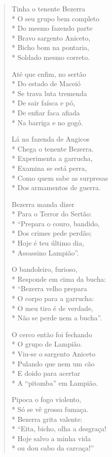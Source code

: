 \begin{verse}
Tinha o tenente Bezerra\\*
O seu grupo bem completo\\*
Do mesmo fazendo parte\\*
Bravo sargento Aniceto,\\*
Bicho bom na pontaria,\\*
Soldado mesmo correto.

Até que enfim, no sertão\\*
Do estado de Maceió\\*
Se trava luta tremenda\\*
De sair faísca e pó,\\*
De enfiar faca afiada\\*
Na barriga e no gogó.

Lá na fazenda de Angicos\\*
Chega o tenente Bezerra.\\*
Experimenta a garrucha,\\*
Examina se está perra,\\*
Como quem sabe as surpresas\\*
Dos armamentos de guerra.

Bezerra manda dizer\\*
Para o Terror do Sertão:\\*
“Prepara o couro, bandido,\\*
Dos crimes pede perdão;\\*
Hoje é teu último dia,\\*
Assassino Lampião”.

O bandoleiro, furioso,\\*
Responde em cima da bucha:\\*
“Bezerra velho prepara\\*
O corpo para a garrucha:\\*
O meu tiro é de verdade,\\*
Não se perde nem a bucha”.

O cerco então foi fechando\\*
O grupo de Lampião.\\*
Viu-se o sargento Aniceto\\*
Pulando que nem um cão\\*
E doido para acertar\\*
A “pitomba” em Lampião.

Pipoca o fogo violento,\\*
Só se vê grossa fumaça.\\*
Bezerra grita valente:\\*
“Eita, bicho, olha a desgraça!\\*
Hoje salvo a minha vida\\*
ou dou cabo da carcaça!”


\end{verse}
